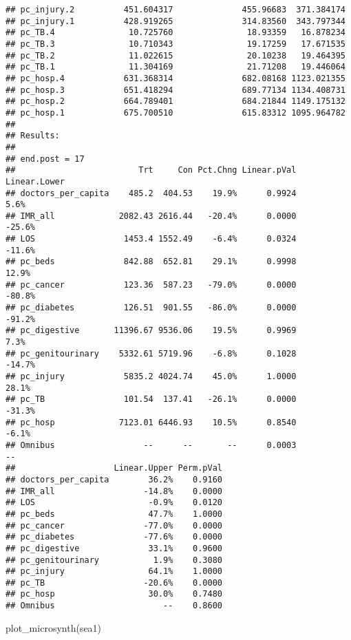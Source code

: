 \documentclass[
]{article}
\newenvironment{Shaded}{\begin{snugshade}}{\end{snugshade}}
\newcommand{\FunctionTok}[1]{\textcolor[rgb]{0.00,0.00,0.00}{#1}}
\newcommand{\NormalTok}[1]{#1}
\begin{document}
\begin{verbatim}
## pc_injury.2          451.604317              455.96683  371.384174
## pc_injury.1          428.919265              314.83560  343.797344
## pc_TB.4               10.725760               18.93359   16.878234
## pc_TB.3               10.710343               19.17259   17.671535
## pc_TB.2               11.022615               20.10238   19.464395
## pc_TB.1               11.304169               21.71208   19.446064
## pc_hosp.4            631.368314              682.08168 1123.021355
## pc_hosp.3            651.418294              689.77134 1134.408731
## pc_hosp.2            664.789401              684.21844 1149.175132
## pc_hosp.1            675.700510              615.83312 1095.964782
## 
## Results: 
## 
## end.post = 17
##                         Trt     Con Pct.Chng Linear.pVal Linear.Lower
## doctors_per_capita    485.2  404.53    19.9%      0.9924         5.6%
## IMR_all             2082.43 2616.44   -20.4%      0.0000       -25.6%
## LOS                  1453.4 1552.49    -6.4%      0.0324       -11.6%
## pc_beds              842.88  652.81    29.1%      0.9998        12.9%
## pc_cancer            123.36  587.23   -79.0%      0.0000       -80.8%
## pc_diabetes          126.51  901.55   -86.0%      0.0000       -91.2%
## pc_digestive       11396.67 9536.06    19.5%      0.9969         7.3%
## pc_genitourinary    5332.61 5719.96    -6.8%      0.1028       -14.7%
## pc_injury            5835.2 4024.74    45.0%      1.0000        28.1%
## pc_TB                101.54  137.41   -26.1%      0.0000       -31.3%
## pc_hosp             7123.01 6446.93    10.5%      0.8540        -6.1%
## Omnibus                  --      --       --      0.0003           --
##                    Linear.Upper Perm.pVal
## doctors_per_capita        36.2%    0.9160
## IMR_all                  -14.8%    0.0000
## LOS                       -0.9%    0.0120
## pc_beds                   47.7%    1.0000
## pc_cancer                -77.0%    0.0000
## pc_diabetes              -77.6%    0.0000
## pc_digestive              33.1%    0.9600
## pc_genitourinary           1.9%    0.3080
## pc_injury                 64.1%    1.0000
## pc_TB                    -20.6%    0.0000
## pc_hosp                   30.0%    0.7480
## Omnibus                      --    0.8600
\end{verbatim}

\begin{Shaded}
\begin{Highlighting}[]
\FunctionTok{plot\_microsynth}\NormalTok{(sea1)}
\end{Highlighting}
\end{Shaded}
\end{document}
